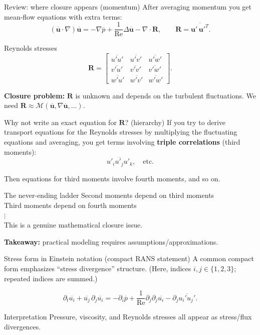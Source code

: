 \documentclass[aspectratio=169]{beamer}
\newcommand{\uu}{\bm{u}}
\newcommand{\pp}{p}
\newcommand{\Rey}{\mathrm{Re}}
\newcommand{\avg}[1]{\overline{#1}}
\newcommand{\up}{\uu'}
\newcommand{\ubar}{\avg{\uu}}
\newcommand{\grad}{\nabla}
\newcommand{\Div}{\nabla\cdot}
\newcommand{\Lap}{\Delta}
\begin{document}
\begin{frame}{Review: where closure appears (momentum)}
After averaging momentum you get mean-flow equations with extra terms:
\[
(\ubar\cdot\grad)\ubar
=
-\grad \avg{\pp}
+\frac{1}{\Rey}\Lap \ubar
-\Div \bm{R},
\qquad
\bm{R}=\avg{\up\,\up^T}.
\]

\begin{block}{Reynolds stresses}
\[
\bm{R}=
\begin{bmatrix}
\avg{u'u'} & \avg{u'v'} & \avg{u'w'}\\
\avg{v'u'} & \avg{v'v'} & \avg{v'w'}\\
\avg{w'u'} & \avg{w'v'} & \avg{w'w'}
\end{bmatrix}.
\]
\end{block}

\textbf{Closure problem:} $\bm{R}$ is unknown and depends on the turbulent fluctuations.
We need $\bm{R}\approx \mathcal{M}(\ubar,\grad\ubar,\ldots)$.
\end{frame}

\begin{frame}{Why not write an exact equation for $\bm{R}$? (hierarchy)}
If you try to derive transport equations for the Reynolds stresses by multiplying the fluctuating equations and averaging, you get terms involving \textbf{triple correlations} (third moments):
\[
\avg{u'_i u'_j u'_k}, \quad \text{etc.}
\]

Then equations for third moments involve fourth moments, and so on.

\begin{block}{The never-ending ladder}
Second moments depend on third moments \\
Third moments depend on fourth moments \\
$\vdots$ \\
This is a genuine mathematical closure issue.
\end{block}

\textbf{Takeaway:} practical modeling requires assumptions/approximations.
\end{frame}

\begin{frame}{Stress form in Einstein notation (compact RANS statement)}
A common compact form emphasizes ``stress divergence'' structure.
(Here, indices $i,j\in\{1,2,3\}$; repeated indices are summed.)

\[
\partial_t \avg{u_i} + \avg{u_j}\,\partial_j \avg{u_i}
=
-\partial_i \avg{p}
+\frac{1}{\Rey}\partial_j\partial_j \avg{u_i}
-\partial_j \avg{u_i' u_j'}.
\]

\begin{block}{Interpretation}
Pressure, viscosity, and Reynolds stresses all appear as stress/flux divergences.
\end{block}
\end{frame}
\end{document}
